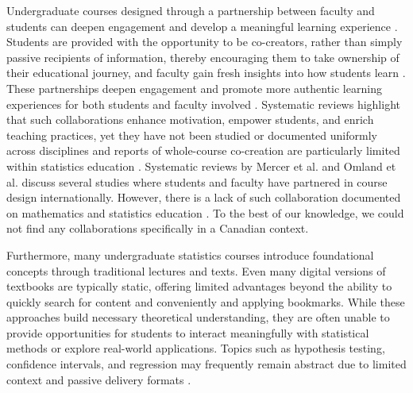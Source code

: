 \documentclass[11pt]{article}
\begin{document}
Undergraduate courses designed through a partnership between faculty and students can deepen engagement and develop a meaningful learning experience \cite{Healey2016,Bovill2019}. 
Students are provided with the opportunity to be co-creators, rather than simply passive recipients of information, thereby encouraging them to take ownership of their educational journey, and faculty gain fresh insights into how students learn \cite{Healey2016}.
These partnerships deepen engagement and promote more authentic learning experiences for both students and faculty involved \cite{Healey2016,Bengtson2013}.
Systematic reviews highlight that such collaborations enhance motivation, empower students, and enrich teaching practices, yet they have not been studied or documented uniformly across disciplines \cite{MercerMapstone2017,Bovill2019} and reports of whole-course co-creation are particularly limited within statistics education \cite{Kim2022}. 
Systematic reviews by Mercer et al. \cite{MercerMapstone2017} and Omland et al. discuss several studies where students and faculty have partnered in course design internationally. However, there is a lack of such collaboration documented on mathematics and statistics education \cite{Duah2011}.
To the best of our knowledge, we could not find any collaborations specifically in a Canadian context.

Furthermore, many undergraduate statistics courses introduce foundational concepts through traditional lectures and texts. 
Even many digital versions of textbooks are typically static, offering limited advantages beyond the ability to quickly search for content and conveniently and applying bookmarks.
While these approaches build necessary theoretical understanding, they are often unable to provide opportunities for students to interact meaningfully with statistical methods or explore real-world applications. 
Topics such as hypothesis testing, confidence intervals, and regression may frequently remain abstract due to limited context and passive delivery formats \cite{Tintle2015}. 
\end{document}
